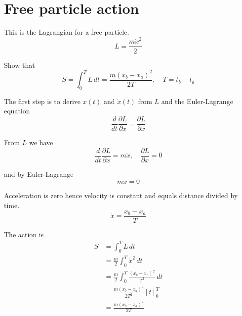 

\section*{Free particle action}

This is the Lagrangian for a free particle.
\begin{equation*}
L=\frac{m\dot x^2}{2}
\end{equation*}

Show that
\begin{equation*}
S=\int_0^TL\,dt=\frac{m(x_b-x_a)^2}{2T},\quad T=t_b-t_a
\end{equation*}

The first step is to derive $x(t)$ and $\dot x(t)$ from $L$ and the Euler-Lagrange equation
\begin{equation*}
\frac{d}{dt}\frac{\partial L}{\partial\dot x}=\frac{\partial L}{\partial x}
\end{equation*}

From $L$ we have
\begin{equation*}
\frac{d}{dt}\frac{\partial L}{\partial\dot x}=m\ddot x,\quad
\frac{\partial L}{\partial x}=0
\end{equation*}

and by Euler-Lagrange
\begin{equation*}
m\ddot x=0
\end{equation*}

Acceleration is zero hence velocity is constant and equals distance divided by time.
\begin{equation*}
\dot x=\frac{x_b-x_a}{T}
\end{equation*}

The action is
\begin{align*}
S&=\int_0^TL\,dt
\\
&=\frac{m}{2}\int_0^T\dot x^2\,dt
\\
&=\frac{m}{2}\int_0^T\frac{(x_b-x_a)^2}{T^2}\,dt
\\
&=\frac{m(x_b-x_a)^2}{2T^2}[t]_0^T
\\
&=\frac{m(x_b-x_a)^2}{2T}
\tag{1}
\end{align*}


